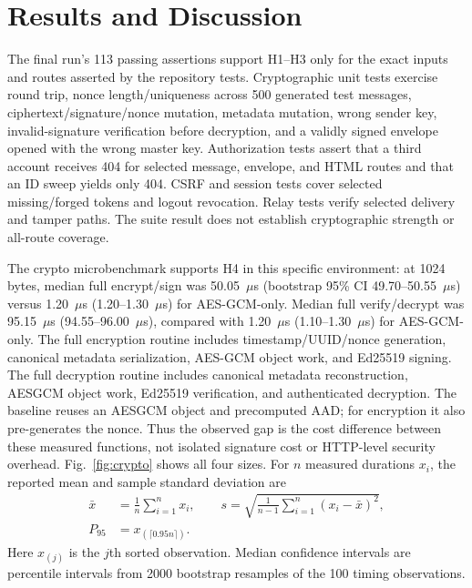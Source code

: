 \documentclass[conference]{IEEEtran}
\begin{document}
\section{Results and Discussion}
The final run's 113 passing assertions support H1--H3 only for the exact inputs and routes asserted by the repository tests. Cryptographic unit tests exercise round trip, nonce length/uniqueness across 500 generated test messages, ciphertext/signature/nonce mutation, metadata mutation, wrong sender key, invalid-signature verification before decryption, and a validly signed envelope opened with the wrong master key. Authorization tests assert that a third account receives 404 for selected message, envelope, and HTML routes and that an ID sweep yields only 404. CSRF and session tests cover selected missing/forged tokens and logout revocation. Relay tests verify selected delivery and tamper paths. The suite result does not establish cryptographic strength or all-route coverage.

The crypto microbenchmark supports H4 in this specific environment: at 1024 bytes, median full encrypt/sign was 50.05~$\mu$s (bootstrap 95\% CI 49.70--50.55~$\mu$s) versus 1.20~$\mu$s (1.20--1.30~$\mu$s) for AES-GCM-only. Median full verify/decrypt was 95.15~$\mu$s (94.55--96.00~$\mu$s), compared with 1.20~$\mu$s (1.10--1.30~$\mu$s) for AES-GCM-only. The full encryption routine includes timestamp/UUID/nonce generation, canonical metadata serialization, AES-GCM object work, and Ed25519 signing. The full decryption routine includes canonical metadata reconstruction, AESGCM object work, Ed25519 verification, and authenticated decryption. The baseline reuses an AESGCM object and precomputed AAD; for encryption it also pre-generates the nonce. Thus the observed gap is the cost difference between these measured functions, not isolated signature cost or HTTP-level security overhead. Fig.~\ref{fig:crypto} shows all four sizes. For $n$ measured durations $x_i$, the reported mean and sample standard deviation are
\begin{equation}
\begin{aligned}
\bar{x}&=\frac{1}{n}\sum_{i=1}^{n}x_i,\qquad
s=\sqrt{\frac{1}{n-1}\sum_{i=1}^{n}(x_i-\bar{x})^2},\\
P_{95}&=x_{(\lceil0.95n\rceil)}.
\end{aligned}
\label{eq:latency}
\end{equation}
Here $x_{(j)}$ is the $j$th sorted observation. Median confidence intervals are percentile intervals from 2000 bootstrap resamples of the 100 timing observations.
\end{document}

